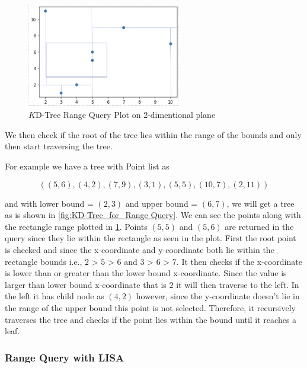 \begin{figure}[htp]
    \centering
    \includegraphics[width=0.6\textwidth]{graphs/Range_Query_plot.png}
    \caption{$K$D-Tree Range Query Plot on 2-dimentional plane}
    \label{fig:KD_Tree_Range_Query_Plot}
\end{figure}

We then check if the root of the tree lies within the range of the bounds and only then start traversing the tree. 

\begin{mscexample}
    For example we have a tree with Point list as 

	$$((5,6),(4,2),(7,9),(3,1),(5,5),(10,7),(2,11))$$
	
	and with lower bound = $(2,3)$ and upper bound = $(6,7)$, we will get a tree as is shown in \ref{fig:KD-Tree_for_Range Query}. We can see the points along with the rectangle range plotted in \ref{fig:KD_Tree_Range_Query_Plot}. Points $(5,5)$ and $(5,6)$ are returned in the query since they lie within the rectangle as seen in the plot. First the root point is checked and since the x-coordinate and y-coordinate both lie within the rectangle bounds i.e., $2$ > $5$ > $6$ and $3$ > $6$ > $7$. It then checks if the x-coordinate is lower than or greater than the lower bound x-coordinate. Since the value is larger than lower bound x-coordinate that is $2$ it will then traverse to the left. In the left it has child node as $(4,2)$ however, since the y-coordinate doesn't lie in the range of the upper bound this point is not selected. Therefore, it recursively traverses the tree and checks if the point lies within the bound until it reaches a leaf.
\end{mscexample}

\subsubsection{Range Query with LISA}

